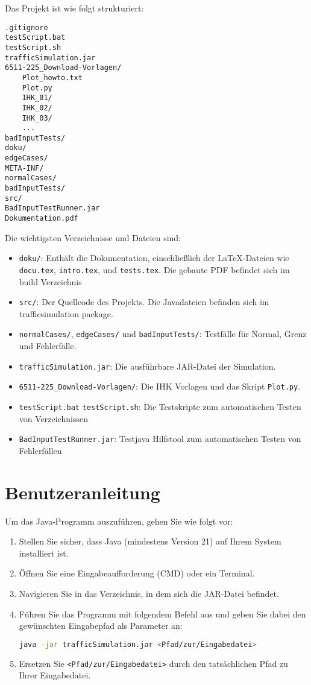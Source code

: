 \documentclass[a4paper,12pt]{report}
\begin{document}
Das Projekt ist wie folgt strukturiert:

\begin{verbatim}
.gitignore
testScript.bat
testScript.sh
trafficSimulation.jar
6511-225_Download-Vorlagen/
    Plot_howto.txt
    Plot.py
    IHK_01/
    IHK_02/
    IHK_03/
    ...
badInputTests/
doku/
edgeCases/
META-INF/
normalCases/
badInputTests/
src/
BadInputTestRunner.jar
Dokumentation.pdf
\end{verbatim}

Die wichtigsten Verzeichnisse und Dateien sind:
\begin{itemize}
    \item \texttt{doku/}: Enthält die Dokumentation, einschließlich der LaTeX-Dateien wie \texttt{docu.tex}, \texttt{intro.tex}, und \texttt{tests.tex}. Die gebaute PDF befindet sich im build Verzeichnis
    \item \texttt{src/}: Der Quellcode des Projekts. Die Javadateien befinden sich im trafficsimulation package.
    \item \texttt{normalCases/}, \texttt{edgeCases/} und \texttt{badInputTests/}: Testfälle für Normal, Grenz und Fehlerfälle.
    \item \texttt{trafficSimulation.jar}: Die ausführbare JAR-Datei der Simulation.
    \item \texttt{6511-225\_Download-Vorlagen/}: Die IHK Vorlagen und das Skript \texttt{Plot.py}.
    \item \texttt{testScript.bat} \texttt{testScript.sh}: Die Testskripte zum automatischen Testen von Verzeichnissen
    \item \texttt{BadInputTestRunner.jar}: Testjava Hilfstool zum automatischen Testen von Fehlerfällen
\end{itemize}

\chapter{Benutzeranleitung}

Um das Java-Programm auszuführen, gehen Sie wie folgt vor:

\begin{enumerate}
    \item Stellen Sie sicher, dass Java (mindestens Version 21) auf Ihrem System installiert ist.
    \item Öffnen Sie eine Eingabeaufforderung (CMD) oder ein Terminal.
    \item Navigieren Sie in das Verzeichnis, in dem sich die JAR-Datei befindet.
    \item Führen Sie das Programm mit folgendem Befehl aus und geben Sie dabei den gewünschten Eingabepfad als Parameter an:
    \begin{lstlisting}[language=bash]
    java -jar trafficSimulation.jar <Pfad/zur/Eingabedatei>
    \end{lstlisting}
    \item Ersetzen Sie \texttt{<Pfad/zur/Eingabedatei>} durch den tatsächlichen Pfad zu Ihrer Eingabedatei.
\end{enumerate}
\end{document}
